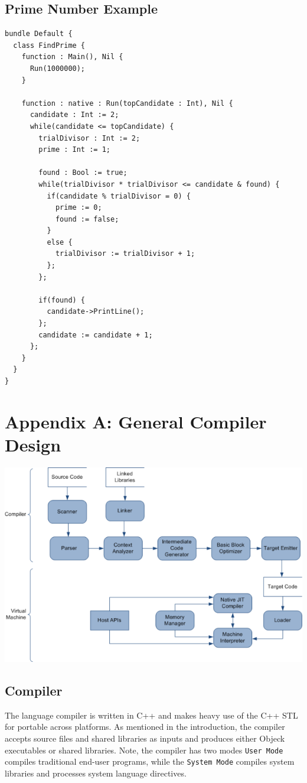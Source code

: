 \documentclass[12pt]{article}
\begin{document}
\subsection{Prime Number Example}
\begin{verbatim}
bundle Default {
  class FindPrime {
    function : Main(), Nil {
      Run(1000000);
    }

    function : native : Run(topCandidate : Int), Nil {
      candidate : Int := 2;
      while(candidate <= topCandidate) {
        trialDivisor : Int := 2;
        prime : Int := 1;

        found : Bool := true;
        while(trialDivisor * trialDivisor <= candidate & found) {
          if(candidate % trialDivisor = 0) {
            prime := 0;
            found := false;
          }
          else {
            trialDivisor := trialDivisor + 1;
          };
        };

        if(found) {
          candidate->PrintLine();
        };
        candidate := candidate + 1;
      };
    }
  }
}
\end{verbatim}

\newpage

\section{Appendix A: General Compiler Design}
\includegraphics[scale=0.60]{../images/compiler_data_flow.png}

\subsection{Compiler}
The language compiler is written in C++ and makes heavy use of the C++ STL for portable across platforms.  As mentioned in the introduction, the compiler accepts source files and shared libraries as inputs and produces either Objeck executables or shared libraries.  Note, the compiler has two modes \texttt{User Mode} compiles traditional end-user programs, while the \texttt{System Mode} compiles system libraries and processes system language directives.
\end{document}
